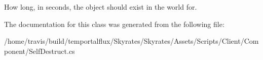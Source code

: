 How long, in seconds, the object should exist in the world for. 



The documentation for this class was generated from the following file\-:\begin{DoxyCompactItemize}
\item 
/home/travis/build/temportalflux/\-Skyrates/\-Skyrates/\-Assets/\-Scripts/\-Client/\-Component/Self\-Destruct.\-cs\end{DoxyCompactItemize}
